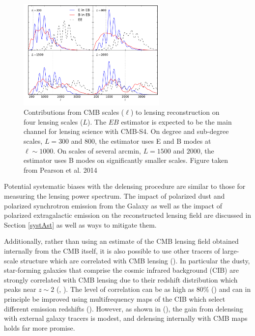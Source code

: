 \begin{figure}[htbp]
\centering
\includegraphics[width=0.65\textwidth]{CMBLensing/signal_contribs.pdf}
\caption{Contributions from CMB scales ($\ell$) to lensing reconstruction on four lensing scales ($L$).  The $EB$ estimator is expected to be the main channel for lensing science with CMB-S4.  On degree and sub-degree scales, $L = 300$ and $800$, the estimator uses E and B modes at $\ell \sim 1000$.  On scales of several arcmin, $L = 1500$ and $2000$, the estimator uses B modes on significantly smaller scales.  Figure taken from Pearson et al. 2014}
\label{sigCon}
\end{figure}

Potential systematic biases with the delensing procedure are similar to those for measuring the lensing power spectrum. The impact of polarized dust and polarized synchrotron emission from the Galaxy as well as the impact of polarized extragalactic emission on the reconstructed lensing field are discussed in Section \ref{systAst} as well as ways to mitigate them.

Additionally, rather than using an estimate of the CMB lensing field obtained internally from the CMB itself, it is also possible to use other tracers of large-scale structure which are correlated with  CMB lensing (\cite{Smith:2010gu}).  In particular the dusty, star-forming galaxies that comprise the cosmic infrared background (CIB) are strongly correlated with CMB lensing due to their redshift distribution which peaks near $z \sim 2$ (\cite{Sherwin:2015baa}, \cite{Simard:2014aqa}).  The level of correlation can be as high as $80\%$ (\cite{Ade:2013aro}) and can in principle be improved using multifrequency maps of the CIB which select different emission redshifts (\cite{Sherwin:2015baa}). However, as shown in (\cite{Smith:2010gu}), the gain from delensing with external galaxy tracers is modest, and delensing internally with CMB maps holds far more promise.


